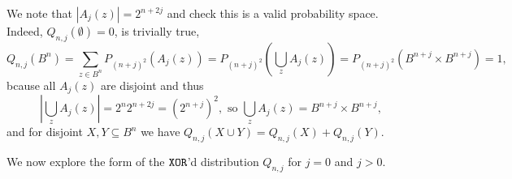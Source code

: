 \documentclass[%
 preprint,
 showpacs,
 showkeys,
 preprintnumbers,
  amsmath,amssymb,
  aps,
 pra,
  longbibliography,
  floatfix,
 ]{revtex4-1}
\theoremstyle{definition}
\begin{document}
We note that $|A_j(z)| = 2^{n+2j}$ and check this is a valid probability space. Indeed,
	 $Q_{n,j}(\emptyset) = 0$, is trivially true,
	$$Q_{n,j}(B^n) = \sum_{z\in B^n}P_{(n+j)^2}(A_j(z)) = P_{(n+j)^2}\left(\bigcup_z A_j(z)\right) = P_{(n+j)^2}\left(B^{n+j}\times B^{n+j}\right) = 1,$$ bcause all $A_j(z)$ are disjoint and thus $$|\bigcup_z A_j(z)| = 2^n 2^{n+2j} = (2^{n+j})^2, \mbox{  so  }  \bigcup_z A_j(z) = B^{n+j}\times B^{n+j},$$ and
	for disjoint  $X,Y \subseteq B^n$ we have $ Q_{n,j}(X\cup Y) = Q_{n,j}(X) + Q_{n,j}(Y)$.

We now explore the form of the ${\tt XOR}$'d distribution $Q_{n,j}$  for  $j=0$ and $j>0$.
\end{document}

